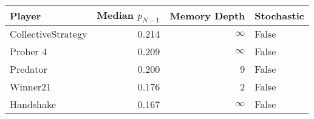\begin{tabular}{lrrl}
\toprule
             Player &  Median $p_{N-1}$ &  Memory Depth & Stochastic \\
\midrule
 CollectiveStrategy &             0.214 &            \(\infty\) &      False \\
           Prober 4 &             0.209 &            \(\infty\) &      False \\
           Predator &             0.200 &             9 &      False \\
           Winner21 &             0.176 &             2 &      False \\
          Handshake &             0.167 &            \(\infty\) &      False \\
\bottomrule
\end{tabular}
